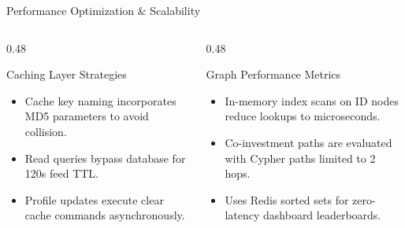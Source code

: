 \documentclass[aspectratio=169, 10pt]{beamer}
\begin{document}
\begin{frame}{Performance Optimization \& Scalability}
  \begin{columns}[T]
    \begin{column}{0.48\textwidth}
      \begin{scard}{Caching Layer Strategies}
        \begin{itemize}
          \item Cache key naming incorporates MD5 parameters to avoid collision.
          \item Read queries bypass database for 120s feed TTL.
          \item Profile updates execute clear cache commands asynchronously.
        \end{itemize}
      \end{scard}
    \end{column}
    \begin{column}{0.48\textwidth}
      \begin{scard}{Graph Performance Metrics}
        \begin{itemize}
          \item In-memory index scans on ID nodes reduce lookups to microseconds.
          \item Co-investment paths are evaluated with Cypher paths limited to 2 hops.
          \item Uses Redis sorted sets for zero-latency dashboard leaderboards.
        \end{itemize}
      \end{scard}
    \end{column}
  \end{columns}
\end{frame}
\end{document}
